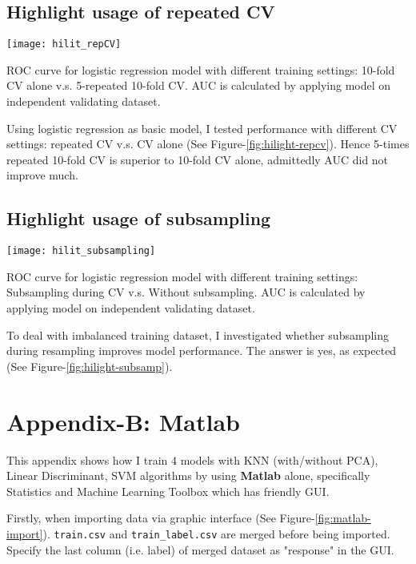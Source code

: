\subsection{Highlight usage of repeated CV}
\begin{marginfigure}[-7in]
	\texttt{[image: hilit\_repCV]}
	\caption{ROC curve for logistic regression model with different training settings: 10-fold CV alone v.s. 5-repeated 10-fold CV. AUC is calculated by applying model on independent validating dataset. }
	\label{fig:hilight-repcv}
\end{marginfigure}
Using logistic regression as basic model, I tested performance with different CV settings: repeated CV v.s. CV alone (See Figure-\ref{fig:hilight-repcv}). Hence 5-times repeated 10-fold CV is superior to 10-fold CV alone, admittedly AUC did not improve much. 
 
\subsection{Highlight usage of subsampling}
\begin{marginfigure}[-2in]
	\texttt{[image: hilit\_subsampling]}
	\caption{ROC curve for logistic regression model with different training settings: Subsampling during CV v.s. Without subsampling. AUC is calculated by applying model on independent validating dataset. }
	\label{fig:hilight-subsamp}
\end{marginfigure}
To deal with imbalanced training dataset, I investigated whether subsampling during resampling improves model performance. The answer is yes, as expected (See Figure-\ref{fig:hilight-subsamp}). 

\section{Appendix-B: Matlab}\label{sec:append-b}

This appendix shows how I train 4 models with KNN (with/without PCA), Linear Discriminant, SVM algorithms by using \textbf{Matlab} alone, specifically Statistics and Machine Learning Toolbox which has friendly GUI. 

Firstly, when importing data via graphic interface (See Figure-\ref{fig:matlab-import}). \texttt{train.csv} and \texttt{train\_label.csv} are merged before being imported. Specify the last column (i.e. label) of merged dataset as "response" in the GUI.

